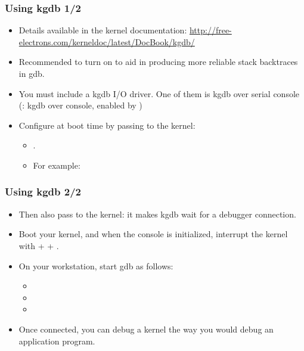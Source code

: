\begin{frame}
  \frametitle{Using kgdb 1/2}
  \begin{itemize}
  \item Details available in the kernel documentation:
    \url{http://free-electrons.com/kerneldoc/latest/DocBook/kgdb/}
  \item Recommended to turn on  to aid in
    producing more reliable stack backtraces in gdb.
  \item You must include a kgdb I/O driver. One of them is kgdb over
    serial console (: kgdb over console, enabled by
    )
  \item Configure  at boot time by passing to the kernel:
    \begin{itemize}
    \item {}.
    \item For example: 
    \end{itemize}
  \end{itemize}
\end{frame}

\begin{frame}
  \frametitle{Using kgdb 2/2}
  \begin{itemize}
  \item Then also pass  to the kernel: it makes kgdb
    wait for a debugger connection.
  \item Boot your kernel, and when the console is initialized,
    interrupt the kernel with  +  + .
  \item On your workstation, start gdb as follows:
    \begin{itemize}
    \item {}
    \item {}
    \item {}
    \end{itemize}
  \item Once connected, you can debug a kernel the way you would debug
    an application program.
  \end{itemize}
\end{frame}

